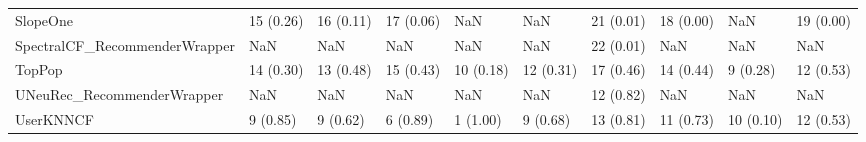 \begin{tabular}{llllllllll}
                           SlopeOne &                15 (0.26) &   16 (0.11) &     17 (0.06) &          NaN &                  NaN &           21 (0.01) &         18 (0.00) &                NaN &         19 (0.00) \\
      SpectralCF\_RecommenderWrapper &                      NaN &         NaN &           NaN &          NaN &                  NaN &           22 (0.01) &               NaN &                NaN &               NaN \\
                             TopPop &                14 (0.30) &   13 (0.48) &     15 (0.43) &    10 (0.18) &            12 (0.31) &           17 (0.46) &         14 (0.44) &           9 (0.28) &         12 (0.53) \\
         UNeuRec\_RecommenderWrapper &                      NaN &         NaN &           NaN &          NaN &                  NaN &           12 (0.82) &               NaN &                NaN &               NaN \\
                          UserKNNCF &                 9 (0.85) &    9 (0.62) &      6 (0.89) &     1 (1.00) &             9 (0.68) &           13 (0.81) &         11 (0.73) &          10 (0.10) &         12 (0.53) \\
\bottomrule
\end{tabular}
